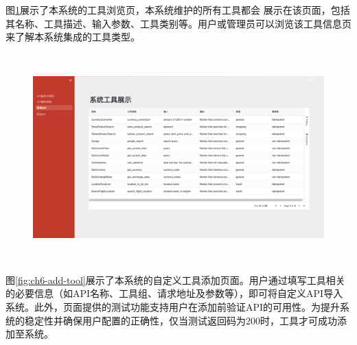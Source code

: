图\ref{fig:ch6-all-tools}展示了本系统的工具浏览页，本系统维护的所有工具都会
展示在该页面，包括其名称、工具描述、输入参数、工具类别等。用户或管理员可以浏览该工具信息页来了解本系统集成的工具类型。

\begin{figure}[H]
  \vspace{1em}
  \centering
  \setlength{\abovecaptionskip}{10pt} %
  \includegraphics[height=8cm]{../assets/ch6-所有API展示.png}
  \label{fig:ch6-all-tools}
\end{figure}



图\ref{fig:ch6-add-tool}展示了本系统的自定义工具添加页面。用户通过填写工具相关的必要信息（如API名称、工具组、请求地址及参数等），即可将自定义API导入系统。此外，页面提供的测试功能支持用户在添加前验证API的可用性。为提升系统的稳定性并确保用户配置的正确性，仅当测试返回码为200时，工具才可成功添加至系统。

